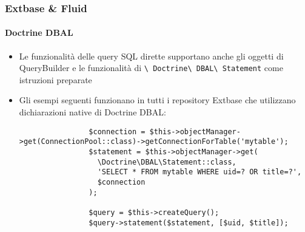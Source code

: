 \begin{frame}[fragile]
	\frametitle{Extbase \& Fluid}
	\framesubtitle{Doctrine DBAL}

	\lstset{basicstyle=\tiny\ttfamily}

	\begin{itemize}
		\item Le funzionalità delle query SQL dirette supportano anche gli oggetti di QueryBuilder e le funzionalità di
			\texttt{\textbackslash
			Doctrine\textbackslash
			DBAL\textbackslash
			Statement} come istruzioni preparate
		\item Gli esempi seguenti funzionano in tutti i repository Extbase che utilizzano dichiarazioni native di Doctrine DBAL:

			\begin{lstlisting}
				$connection = $this->objectManager->get(ConnectionPool::class)->getConnectionForTable('mytable');
				$statement = $this->objectManager->get(
				  \Doctrine\DBAL\Statement::class,
				  'SELECT * FROM mytable WHERE uid=? OR title=?',
				  $connection
				);

				$query = $this->createQuery();
				$query->statement($statement, [$uid, $title]);
			\end{lstlisting}
	\end{itemize}

\end{frame}

